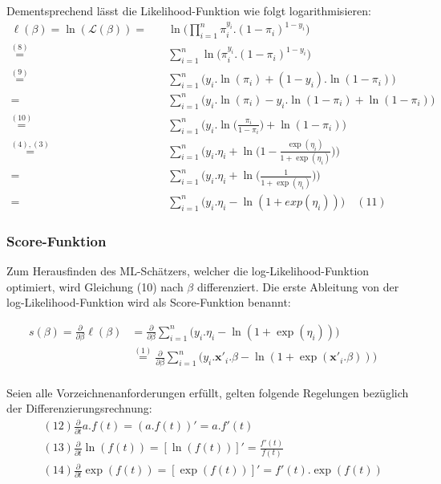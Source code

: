 \documentclass[12pt,]{article}
\begin{document}
Dementsprechend lässt die Likelihood-Funktion wie folgt
logarithmisieren: \[
\begin{aligned}
\ell(\beta) = \ln(\mathcal{L}(\beta)) = \quad &\ln \Bigg( \prod_{i=1}^{n} \pi_i^{y_i}.(1-\pi_i)^{1-y_i} \Bigg) \\
\mathrel{\overset{(8)}{=}} \quad &\sum_{i = 1}^{n} \ln \Big(\pi_i^{y_i}.(1-\pi_i)^{1-y_i}\Big) \\
\mathrel{\overset{(9)}{=}} \quad &\sum_{i = 1}^{n} \Big( y_i.\ln(\pi_i) + (1-y_i).\ln(1-\pi_i) \Big) \\
= \quad &\sum_{i = 1}^{n} \Big( y_i.\ln(\pi_i) - y_i.\ln(1-\pi_i) + \ln(1-\pi_i) \Big) \\
\mathrel{\overset{(10)}{=}} \quad &\sum_{i = 1}^{n} \Bigg( y_i.\ln \Big(\frac{\pi_i}{1-\pi_i}\Big) + \ln(1-\pi_i) \Bigg) \\
\mathrel{\overset{(4),(3)}{=}} \ &\sum_{i = 1}^{n} \Bigg( y_i.\eta_i + \ln \Big( 1- \frac{\exp(\eta_i)}{1 + \exp(\eta_i)} \Big) \Bigg) \\
= \quad &\sum_{i = 1}^{n} \Bigg( y_i.\eta_i + \ln \Big( \frac{1}{1+\exp(\eta_i)}\Big) \Bigg) \\
= \quad &\sum_{i = 1}^{n} \Big( y_i.\eta_i - \ln (1 + exp(\eta_i)) \Big) \quad (11)
\end{aligned}
\]

\subsubsection{Score-Funktion}\label{score-funktion}

Zum Herausfinden des ML-Schätzers, welcher die log-Likelihood-Funktion
optimiert, wird Gleichung (10) nach \(\beta\) differenziert. Die erste
Ableitung von der log-Likelihood-Funktion wird als Score-Funktion
benannt:

\[
\begin{aligned}
s(\beta) = \frac{\partial}{\partial \beta}  \ell(\beta) &= \frac{\partial}{\partial \beta} \sum_{i = 1}^{n} \Big( y_i.\eta_i - \ln (1 + \exp(\eta_i)) \Big) \quad \\
&\mathrel{\overset{(1)}{=}} \frac{\partial}{\partial \beta} \sum_{i = 1}^{n} \Big( y_i.\mathbf{x'}_i.\beta  - \ln (1 + \exp(\mathbf{x'}_i.\beta )) \Big) \quad \\ 
\end{aligned}
\]

Seien alle Vorzeichnenanforderungen erfüllt, gelten folgende Regelungen
bezüglich der Differenzierungsrechnung: \[
\begin{aligned}
&(12) \frac{\partial}{\partial t} a.f(t) = (a.f(t))' = a.f'(t) \\
&(13) \frac{\partial}{\partial t} \ln(f(t)) = [\ln(f(t))]' = \frac{f'(t)}{f(t)} \\ 
&(14) \frac{\partial}{\partial t} \exp(f(t)) = [\exp(f(t))]' = f'(t).\exp(f(t)) \\
\end{aligned}
\]
\end{document}
